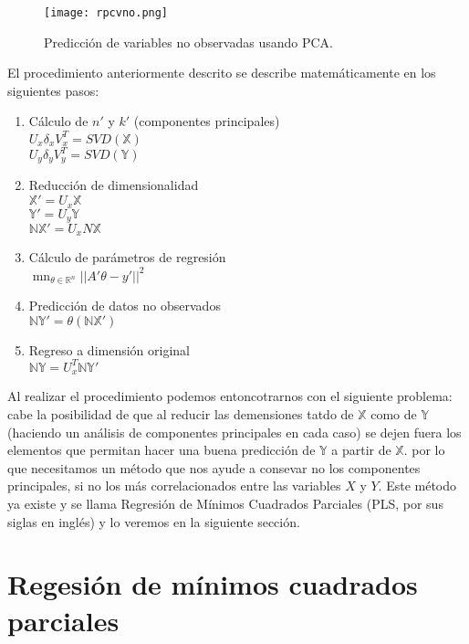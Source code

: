 \begin{figure}
\centering
\texttt{[image: rpcvno.png]}
\caption{Predicción de variables no observadas usando PCA.}\label{regresionPCA}
\end{figure}

El procedimiento anteriormente descrito se describe matemáticamente en los siguientes pasos: 

\begin{enumerate}
\item Cálculo de $n'$ y $k'$ (componentes principales) \\
	$U_{x}\delta_{x}V_{x}^{T} = SVD(\mathbb{X})$\\
	$U_{y}\delta_{y}V_{y}^{T} = SVD(\mathbb{Y})$

\item Reducción de dimensionalidad\\
	$\mathbb{X'} = U_{x}\mathbb{X}$\\
	$\mathbb{Y'} = U_{y}\mathbb{Y}$\\
	$\mathbb{NX'} = U_{x} N\mathbb{X}$

\item Cálculo de parámetros de regresión\\
	$\mathop{m\acute{i}n}_{\theta \in \mathbb{R}^{n}} ||A'\theta -y'||^{2}$

\item Predicción de datos no observados\\
	$\mathbb{NY'} = \theta(\mathbb{NX'})$
	
\item Regreso a dimensión original\\ 
	$\mathbb{NY} = U_{x}^{T}\mathbb{NY'} $

\end{enumerate}

Al realizar el procedimiento podemos entoncotrarnos con el siguiente problema: cabe la posibilidad de que al reducir las demensiones tatdo de $\mathbb{X}$ como de $\mathbb{Y}$ (haciendo un análisis de componentes principales en cada caso) se dejen fuera los elementos que permitan hacer una buena predicción de $\mathbb{Y}$ a partir de $\mathbb{X}$. por lo que necesitamos un método que nos ayude a consevar no los componentes principales, si no los más correlacionados entre las variables $X$ y $Y$. Este método ya existe y se llama Regresión de Mínimos Cuadrados Parciales (PLS, por sus siglas en inglés) y lo veremos en la siguiente sección. 

\section{Regesión de mínimos cuadrados parciales}

